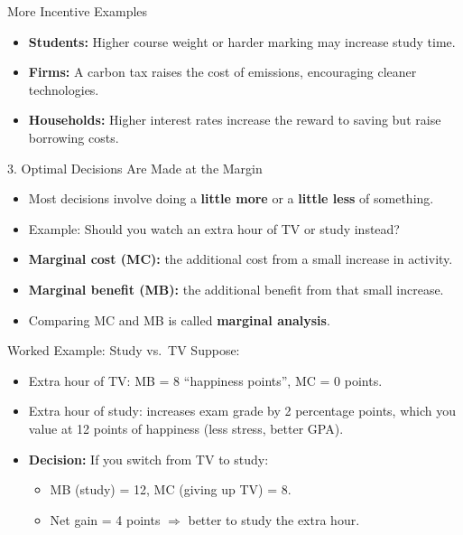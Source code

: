 \documentclass[aspectratio=169]{beamer}
\begin{document}
\begin{frame}{More Incentive Examples}
\transfade
\begin{itemize}
  \item \textbf{Students:} Higher course weight or harder marking may increase study time.
  \item \textbf{Firms:} A carbon tax raises the cost of emissions, encouraging cleaner technologies.
  \item \textbf{Households:} Higher interest rates increase the reward to saving but raise borrowing costs.
\end{itemize}
\end{frame}

\begin{frame}{3. Optimal Decisions Are Made at the Margin}
\transfade
\begin{itemize}
  \item Most decisions involve doing a \textbf{little more} or a \textbf{little less} of something.
  \item Example: Should you watch an extra hour of TV or study instead?
  \item \textbf{Marginal cost (MC):} the additional cost from a small increase in activity.
  \item \textbf{Marginal benefit (MB):} the additional benefit from that small increase.
  \item Comparing MC and MB is called \textbf{marginal analysis}.
\end{itemize}
\end{frame}

\begin{frame}{Worked Example: Study vs.\ TV}
\transfade
\small
Suppose:
\begin{itemize}
  \item Extra hour of TV: MB = 8 ``happiness points'', MC = 0 points.
  \item Extra hour of study: increases exam grade by 2 percentage points, which you value at 12 points of happiness (less stress, better GPA).
  \item \textbf{Decision:} If you switch from TV to study:
  \begin{itemize}
    \item MB (study) = 12, MC (giving up TV) = 8.
    \item Net gain = 4 points \(\Rightarrow\) better to study the extra hour.
  \end{itemize}
\end{itemize}
\end{frame}
\end{document}
